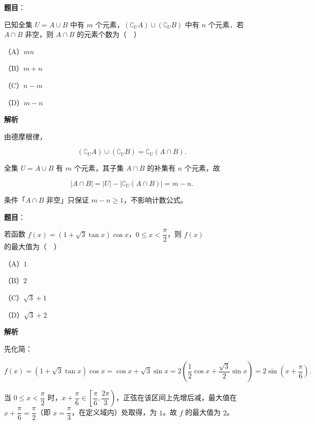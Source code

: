 \begin{answer}

\textbf{题目}：

已知全集 $U=A\cup B$ 中有 $m$ 个元素，$(\complement_U A)\cup(\complement_U B)$ 中有 $n$ 个元素．若 $A\cap B$ 非空，则 $A\cap B$ 的元素个数为（　）

（A）$mn$

（B）$m+n$

（C）$n-m$

（D）$m-n$

\textbf{解析}

由德摩根律，

\nopagebreak[4]
\[(\complement_U A)\cup(\complement_U B)=\complement_U(A\cap B).\]

全集 $U=A\cup B$ 有 $m$ 个元素，其子集 $A\cap B$ 的补集有 $n$ 个元素，故

\nopagebreak[4]
\[|A\cap B|=|U|-|\complement_U(A\cap B)|=m-n.\]

条件「$A\cap B$ 非空」只保证 $m-n\geqslant1$，不影响计数公式。


\end{answer}
\begin{answer}

\textbf{题目}：

若函数 $f(x)=(1+\sqrt3\tan x)\cos x$，$0\leqslant x<\dfrac{\pi}{2}$，则 $f(x)$ 的最大值为（　）

（A）$1$

（B）$2$

（C）$\sqrt3+1$

（D）$\sqrt3+2$

\textbf{解析}

先化简：

\nopagebreak[4]
\[f(x)=(1+\sqrt3\tan x)\cos x=\cos x+\sqrt3\sin x=2\left(\frac12\cos x+\frac{\sqrt3}{2}\sin x\right)=2\sin\left(x+\frac{\pi}{6}\right).\]

当 $0\leqslant x<\dfrac{\pi}{2}$ 时，$x+\dfrac{\pi}{6}\in\left[\dfrac{\pi}{6},\dfrac{2\pi}{3}\right)$，正弦在该区间上先增后减，最大值在 $x+\dfrac{\pi}{6}=\dfrac{\pi}{2}$（即 $x=\dfrac{\pi}{3}$，在定义域内）处取得，为 $1$。故 $f$ 的最大值为 $2$。


\end{answer}
